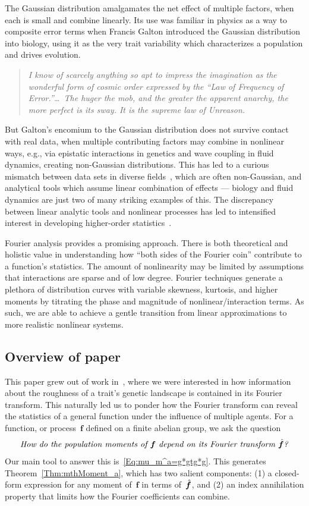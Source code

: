 \documentclass[letterpaper,11pt]{article}
\newcommand{\bs}[1]{{\boldsymbol{#1}}}
\newcommand{\hatbsf}{{\kern+0.25em}\hat{{\kern-0.25em}\bs{f}}}
\theoremstyle{definition} \newtheorem{remark}{Remark}
\begin{document}
The Gaussian distribution amalgamates the net effect of multiple factors, when each is small and combine linearly. Its use was familiar in physics as a way to composite error terms when Francis Galton introduced the Gaussian distribution into biology, using it as the very trait variability which characterizes a population and drives evolution.
\begin{quote}
\emph{I know of scarcely anything so apt to impress the imagination as the wonderful form of cosmic order expressed by the ``Law of Frequency of Error.''\ldots\
The huger the mob, and the greater the apparent anarchy, the more perfect is its sway. It is the supreme law of Unreason.}~\cite[p.66]{galton1889natural}
\end{quote}

But Galton's encomium to the Gaussian distribution does not survive contact with real data, when multiple contributing factors may combine in nonlinear ways, e.g., via epistatic interactions in genetics and wave coupling in fluid dynamics, creating non-Gaussian distributions. This has led to a curious mismatch between data sets in diverse fields~\cite{taleb2023statistical}, which are often non-Gaussian, and analytical tools which assume linear combination of effects --- biology and fluid dynamics are just two of many striking examples of this. The discrepancy between linear analytic tools and nonlinear processes has led to intensified interest in developing higher-order statistics~\cite{mendel1991tutorialHigherOrderStats, swami1997bibHOS}.

Fourier analysis provides a promising approach. There is both theoretical and holistic value in understanding how ``both sides of the Fourier coin'' contribute to a function's statistics. The amount of nonlinearity may be limited by assumptions that interactions are sparse and of low degree. Fourier techniques generate a plethora of distribution curves with variable skewness, kurtosis, and higher moments by titrating the phase and magnitude of nonlinear/interaction terms. As such, we are able to achieve a gentle transition from linear approximations to more realistic nonlinear systems.


\subsection{Overview of paper}
This paper grew out of work in~\cite{doro2021fourierTransQuantTraitCS}, where we were interested in how information about the roughness of a trait's genetic landscape is contained in its Fourier transform. This naturally led us to ponder how the Fourier transform can reveal the statistics of a general function under the influence of multiple agents. For a function, or process~$\bs{f}$ defined on a finite abelian group, we ask the question
$$
\text{\emph{How do the population moments of~$\bs{f}$ depend on its Fourier transform~$\hatbsf$?}}
$$
Our main tool to answer this is~\eqref{Eq:mu_m^a=g*gtg*g}. This generates Theorem~\ref{Thm:mthMoment_a}, which has two salient components: (1) a closed-form expression for any moment of~$\bs{f}$ in terms of~$\hatbsf$, and (2) an index annihilation property that limits how the Fourier coefficients can combine.
\end{document}
